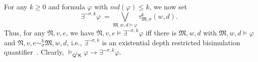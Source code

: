 \documentclass{lmcs} %
\theoremstyle{plain}\newtheorem{satz}[thm]{Satz} %
\newtheorem{lemma}[theorem]{Lemma}
\newcommand{\md}{\textit{md}}
\newcommand{\FOMK}{\ensuremath{\mathsf{Q^1K}}}
\newcommand{\bs}{\boldsymbol{\beta}}
\begin{document}
%
%
For any $k\geq 0$ and formula $\varphi$ with $\md(\varphi) \leq k$, we now set 
%
$$
\exists^{\sim\sigma,k}\varphi ~= \bigvee_{\mathfrak{M},w,d \models \varphi} \tau_{\mathfrak{M},\sigma}^{k}(w,d).
$$
%
Thus, for any $\mathfrak{N},v,e$, we have $\mathfrak{N},v,e \models \exists^{\sim\sigma,k}\varphi$ iff there is $\mathfrak{M},w,d$ with $\mathfrak{M},w,d \models \varphi$ and $\mathfrak{N},v,e \sim_{\sigma}^{k} \mathfrak{M},w,d$, i.e., $\exists^{\sim\sigma,k}$ is an existential depth restricted bisimulation quantifier~\cite{DBLP:journals/japll/DAgostinoL06,French06}. Clearly, $\models_\FOMK \varphi \rightarrow \exists^{\sim\sigma,k}\varphi$. 
\end{document}
